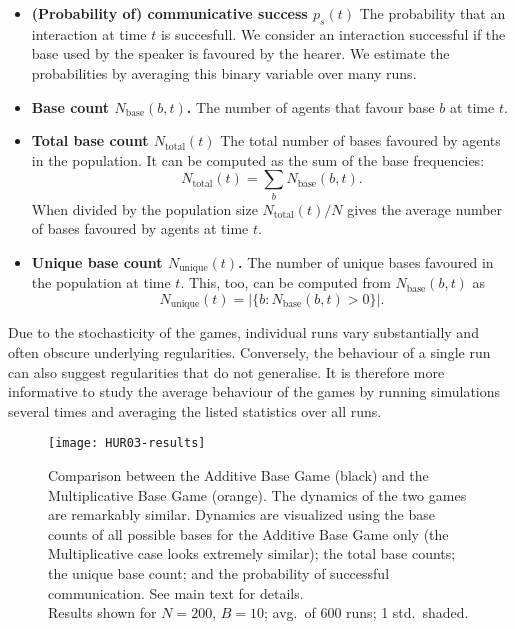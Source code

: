 \documentclass{../src/bcthesispart}
\begin{document}
\begin{itemize}
	\item \textbf{(Probability of) communicative success $p_s(t)$} The probability that an interaction at time $t$ is succesfull. We consider an interaction successful if the base used by the speaker is favoured by the hearer. We estimate the probabilities by averaging this binary variable over many runs.
	\item \textbf{Base count $N_{\text{base}}(b, t)$.} 
		The number of agents that favour base $b$ at time $t$.
	\item \textbf{Total base count $N_{\text{total}}(t)$} 
		The total number of bases favoured by agents in the population.
		It can be computed as the sum of the base frequencies:\
		\[ 
			N_{\text{total}}(t) = \sum_b N_{\text{base}}(b, t).
		\] 
		When divided by the population size $N_{\text{total}}(t)/N$ gives the average number of bases favoured by agents at time $t$.
	\item \textbf{Unique base count $N_{\text{unique}}(t)$.} The number of unique bases favoured in the population at time $t$. This, too, can be computed from $N_{\text{base}}(b, t)$ as
		\[
			N_{\text{unique}}(t) = |\{b: N_{\text{base}}(b, t) > 0\}|.
		\]
\end{itemize}
Due to the stochasticity of the games, individual runs vary substantially and often obscure underlying regularities.
Conversely, the behaviour of a single run can also suggest regularities that do not generalise.
It is therefore more informative to study the average behaviour of the games by running simulations several times and averaging the listed statistics over all runs.

\begin{SCfigure}
	\texttt{[image: HUR03-results]}	
	\caption{Comparison between the Additive Base Game (black) and the Multiplicative Base Game (orange). 
		The dynamics of the two games are remarkably similar.
		Dynamics are visualized using
		 the base counts of all possible bases for the Additive Base Game only (the Multiplicative case looks extremely similar);
		\subfig{B} the total base counts;
		 the unique base count; and
		 the probability of successful communication.
		See main text for details.
		\\[1em]
		Results shown for $N=200$, $B=10$; avg.\ of 600 runs; 1 std.\ shaded.
		\label{fig:add-vs-mul}}
\end{SCfigure}
\end{document}
